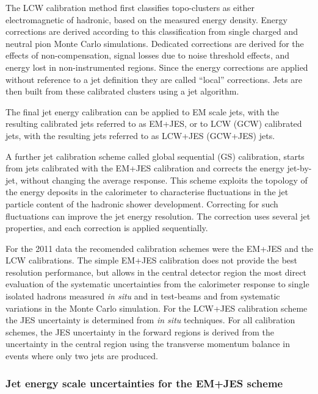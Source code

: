 The LCW calibration method first classifies topo-clusters as either electromagnetic of hadronic, based on the measured energy density. Energy corrections are derived according to this classification from single charged and neutral pion Monte Carlo simulations. Dedicated corrections are derived for the effects of non-compensation, signal losses due to noise threshold effects, and energy lost in non-instrumented regions. Since the energy corrections are applied without reference to a jet definition they are called ``local'' corrections. Jets are then built from these calibrated clusters using a jet algorithm.  

The final jet energy calibration can be applied to EM scale jets, with the resulting calibrated jets referred to as EM+JES, or to LCW (GCW) calibrated jets, with the resulting jets referred to as LCW+JES (GCW+JES) jets.

A further jet calibration scheme called global sequential (GS) calibration, starts from jets calibrated with the EM+JES calibration and corrects the energy jet-by-jet, without changing the average response. This scheme exploits the topology of the energy deposits in the calorimeter to characterise fluctuations in the jet particle content of the hadronic shower development.  Correcting for such fluctuations can improve the jet energy resolution. The correction uses several jet properties, and each correction is applied sequentially.


For the 2011 data the recomended calibration schemes were the EM+JES and the LCW calibrations. The simple EM+JES calibration does not provide the best resolution performance, but allows in the central detector region the most direct evaluation of the systematic uncertainties from the calorimeter response to single isolated hadrons measured \emph{in situ}  and in test-beams and from systematic variations in the Monte Carlo simulation.  For the LCW+JES calibration scheme the JES uncertainty is determined from \emph{in situ}  techniques. For all calibration schemes, the JES uncertainty in the forward regions is derived from the uncertainty in the central region using the transverse momentum balance in events where only two jets are produced. 



\subsubsection{Jet energy scale uncertainties for the EM+JES scheme}

